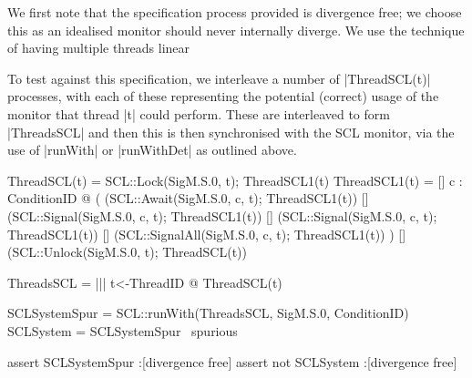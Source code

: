 



We first note that the specification process provided is divergence free; we choose this as an idealised monitor should never internally diverge. We use the technique of having multiple threads linear

To test against this specification, we interleave a number of |ThreadSCL(t)| processes, with each of these representing the potential (correct) usage of the monitor that thread |t| could perform. These are interleaved to form |ThreadsSCL| and then this is then synchronised with the SCL monitor, via the use of |runWith| or |runWithDet| as outlined above.

\begin{cspm}
ThreadSCL(t) = SCL::Lock(SigM.S.0, t); ThreadSCL1(t)
ThreadSCL1(t) =   
  [] c : ConditionID @ 
     (
          (SCL::Await(SigM.S.0, c, t); ThreadSCL1(t))      
      [] (SCL::Signal(SigM.S.0, c, t); ThreadSCL1(t))
      [] (SCL::Signal(SigM.S.0, c, t); ThreadSCL1(t))
      [] (SCL::SignalAll(SigM.S.0, c, t); ThreadSCL1(t))
     )
  [] (SCL::Unlock(SigM.S.0, t); ThreadSCL(t))

ThreadsSCL = ||| t<-ThreadID @ ThreadSCL(t)

SCLSystemSpur = SCL::runWith(ThreadsSCL, SigM.S.0, ConditionID)
SCLSystem = SCLSystemSpur \ {spurious}

assert SCLSystemSpur :[divergence free]
assert not SCLSystem :[divergence free]
\end{cspm}

